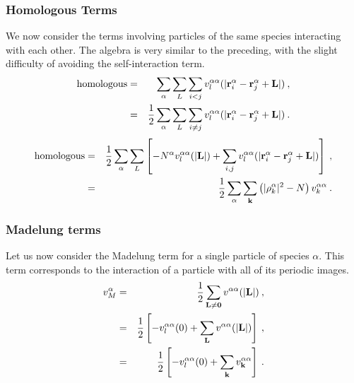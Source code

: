 \subsubsection{Homologous Terms}
We now consider the terms involving particles of the same species
interacting with each other.  The algebra is very similar to the
preceding, with the slight difficulty of avoiding the self-interaction term.
\begin{eqnarray}
\text{homologous} & = & \sum_\alpha \sum_L \sum_{i<j} v_l^{\alpha
  \alpha}(|\mathbf{r}_i^\alpha - \mathbf{r}_j^\alpha + \mathbf{L}|)\:, \\
 & = & \frac{1}{2} \sum_\alpha \sum_L \sum_{i\neq j} v_l^{\alpha
  \alpha}(|\mathbf{r}_i^\alpha - \mathbf{r}_j^\alpha + \mathbf{L}|)\:. 
\end{eqnarray}
\begin{eqnarray}
\text{homologous} & = & \frac{1}{2} \sum_\alpha \sum_L 
\left[
-N^\alpha v_l^{\alpha \alpha}(|\mathbf{L}|)  + \sum_{i,j} v^{\alpha \alpha}_l(|\mathbf{r}_i^\alpha - \mathbf{r}_j^\alpha + \mathbf{L}|)
  \right]\:, \\
& = & \frac{1}{2} \sum_\alpha \sum_{\mathbf{k}} \left(|\rho_k^\alpha|^2 - N
\right) v_k^{\alpha \alpha}\:.
\end{eqnarray}
\subsubsection{Madelung terms}
Let us now consider the Madelung term for a single particle of species
$\alpha$.  This term corresponds to the interaction of a particle with
all of its periodic images.  
\begin{eqnarray}
v_M^{\alpha} & = & \frac{1}{2} \sum_{\mathbf{L} \neq \mathbf{0}} v^{\alpha
  \alpha}(|\mathbf{L}|)\:, \\
& = & \frac{1}{2} \left[ -v_l^{\alpha \alpha}(0) + \sum_{\mathbf{L}} v^{\alpha
  \alpha}(|\mathbf{L}|) \right]\:, \\
& = & \frac{1}{2} \left[ -v_l^{\alpha \alpha}(0) + \sum_{\mathbf{k}} v^{\alpha
  \alpha}_{\mathbf{k}} \right]\:.  
\end{eqnarray}
